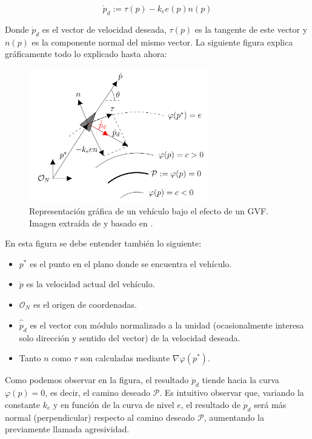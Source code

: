 \begin{equation} \label{eq: GVF}
    \dot{p}_d := \tau(p) - k_e e(p) n(p)
\end{equation}

Donde $\dot{p}_d$ es el vector de velocidad deseada, $\tau(p)$ es la tangente de este vector y
$n(p)$ es la componente normal del mismo vector. La siguiente figura explica gráficamente
todo lo explicado hasta ahora:

\begin{figure}[h]
    \centering
    \includegraphics[width=0.7\textwidth]{img/fig/fig3.3-gvf-diagram.png}
    \caption{Representación gráfica de un vehículo bajo el efecto de un GVF. 
    Imagen extraída de \cite{tfm-jesus} y basado en \cite{gvf-hector}.}
    \label{fig:gvf-diagram}
\end{figure}

En esta figura se debe entender también lo siguiente:

\begin{itemize}
    \item $p^*$ es el punto en el plano donde se encuentra el vehículo.
    \item $\dot p$ es la velocidad actual del vehículo.
    \item $\mathcal{O}_N$ es el origen de coordenadas.
    \item $\hat{\dot{p}}_d$ es el vector con módulo normalizado a la unidad (ocasionalmente interesa solo dirección y sentido del vector) de la velocidad deseada.
    \item Tanto $n$ como $\tau$ son calculadas mediante $\nabla\varphi(p^*)$.
\end{itemize}

Como podemos observar en la figura, el resultado $\dot p_d$ tiende hacia la curva 
$\varphi(p) = 0$, es decir, el camino deseado $\mathcal{P}$. 
Es intuitivo observar que, variando la constante $k_e$ y en función de la 
curva de nivel $e$, el resultado de $\dot p_d$ será más normal (perpendicular) 
respecto al camino deseado $\mathcal{P}$, aumentando la previamente llamada agresividad.

